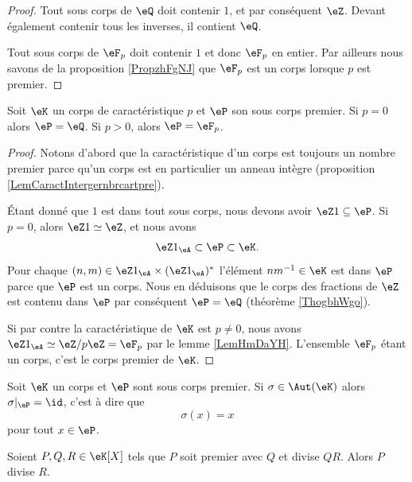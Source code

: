 \begin{proof}
    Tout sous corps de \( \eQ\) doit contenir \( 1\), et par conséquent \( \eZ\). Devant également contenir tous les inverses, il contient \( \eQ\).

    Tout sous corps de \(\eF_p \) doit contenir \( 1\) et donc \( \eF_p\) en entier. Par ailleurs nous savons de la proposition \ref{PropzhFgNJ} que \( \eF_p\) est un corps lorsque \( p\) est premier.
\end{proof}

\begin{proposition}
    Soit \( \eK\) un corps de caractéristique \( p\) et \( \eP\) son sous corps premier. Si \( p=0\) alors \( \eP=\eQ\). Si \( p>0\), alors \( \eP=\eF_p\).
\end{proposition}

\begin{proof}
    Notons d'abord que la caractéristique d'un corps est toujours un nombre premier parce qu'un corps est en particulier un anneau intègre (proposition \ref{LemCaractIntergernbrcartpre}).

    Étant donné que \( 1\) est dans tout sous corps, nous devons avoir \( \eZ 1\subseteq \eP\). Si \( p=0\), alors \( \eZ 1\simeq \eZ\), et nous avons
    \begin{equation}
        \eZ 1_{\eA}\subset \eP\subset \eK.
    \end{equation}
    Pour chaque \( (n,m)\in \eZ 1_{\eA}\times (\eZ 1_{\eA})^*\) l'élément \( nm^{-1}\in \eK\) est dans \( \eP\) parce que \( \eP\) est un corps. Nous en déduisons que le corps des fractions de \( \eZ\) est contenu dans \( \eP\) par conséquent \( \eP=\eQ\) (théorème \ref{ThogbhWgo}). 

    Si par contre la caractéristique de \( \eK\) est \( p\neq 0\), nous avons \( \eZ 1_{\eA}\simeq\eZ/p\eZ=\eF_p\) par le lemme \ref{LemHmDaYH}. L'ensemble \( \eF_p\) étant un corps, c'est le corps premier de \( \eK\).
\end{proof}

\begin{proposition}     \label{PropqPPrgJ}
    Soit \( \eK\) un corps et \( \eP\) sont sous corps premier. Si \( \sigma\in\Aut(\eK)\) alors \( \sigma|_{\eP}=\id\), c'est à dire que
    \begin{equation}
        \sigma(x)=x
    \end{equation}
    pour tout \( x\in \eP\).
\end{proposition}

\begin{theorem}  \label{ThoLLgIsig}
    Soient \( P,Q,R\in \eK[X]\) tels que \( P\) soit premier avec \( Q\) et divise \( QR\). Alors \( P\) divise \( R\).
\end{theorem}


